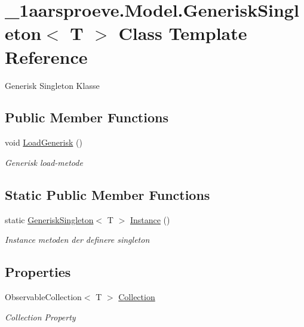 \hypertarget{class__1aarsproeve_1_1_model_1_1_generisk_singleton}{}\section{\+\_\+1aarsproeve.\+Model.\+Generisk\+Singleton$<$ T $>$ Class Template Reference}
\label{class__1aarsproeve_1_1_model_1_1_generisk_singleton}


Generisk Singleton Klasse  


\subsection*{Public Member Functions}
\begin{DoxyCompactItemize}
\item 
void \hyperlink{class__1aarsproeve_1_1_model_1_1_generisk_singleton_a600d0c0ce520544d7037730f6c857aaa}{Load\+Generisk} ()
\begin{DoxyCompactList}\small\item\em Generisk load-\/metode \end{DoxyCompactList}\end{DoxyCompactItemize}
\subsection*{Static Public Member Functions}
\begin{DoxyCompactItemize}
\item 
static \hyperlink{class__1aarsproeve_1_1_model_1_1_generisk_singleton}{Generisk\+Singleton}$<$ T $>$ \hyperlink{class__1aarsproeve_1_1_model_1_1_generisk_singleton_a68d5e62e7d199df6c63011a4ac6e43b6}{Instance} ()
\begin{DoxyCompactList}\small\item\em Instance metoden der definere singleton \end{DoxyCompactList}\end{DoxyCompactItemize}
\subsection*{Properties}
\begin{DoxyCompactItemize}
\item 
Observable\+Collection$<$ T $>$ \hyperlink{class__1aarsproeve_1_1_model_1_1_generisk_singleton_a350a2fb273daada34ad4fab80105b543}{Collection}
\begin{DoxyCompactList}\small\item\em Collection Property \end{DoxyCompactList}\end{DoxyCompactItemize}


